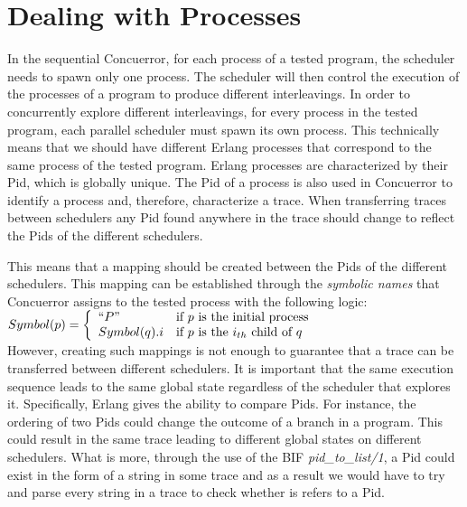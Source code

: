 \section{Dealing with Processes}

In the sequential Concuerror, for each process of a tested program, the scheduler needs to spawn only one process. The scheduler will then control
the execution of the processes of a program to produce different interleavings.
In order to concurrently explore different interleavings, for every process in the tested program, each parallel scheduler must spawn its own process. This technically means that we should have different Erlang processes
that correspond to the same process of the tested program. Erlang processes are characterized by their Pid, which is globally unique.
The Pid of a process is also used in Concuerror to identify a process and, therefore, characterize a trace. When transferring traces
between schedulers any Pid found anywhere in the trace should change to reflect the Pids of the different schedulers.  

This means that a mapping should be created between the Pids of the different schedulers. This mapping can be established through
the \textit{symbolic names} that Concuerror assigns to the tested process with the following logic:
\\

$ Symbol(p) =
\left\{
    \begin{array}{ll}
        ``P"               &   \mbox{if $p$ is the initial process} \\
        Symbol(q).i     &   \mbox{if $p$ is the  $i_{th}$ child of $q$}
    \end{array}
\right.$
\\

However, creating such mappings is not enough to guarantee that a trace can be transferred between different schedulers. It is important
that the same execution sequence leads to the same global state regardless of the scheduler that explores it. Specifically, Erlang
gives the ability to compare Pids. For instance, the ordering of two Pids could change the outcome of a branch in a program. This could 
result in the same trace leading to different global states on different schedulers. What is more, through the use
of the BIF \textit{pid\_to\_list/1}, a Pid could exist in the form of a string in some trace and as a result we would have to try and parse
every string in a trace to check whether is refers to a Pid.

